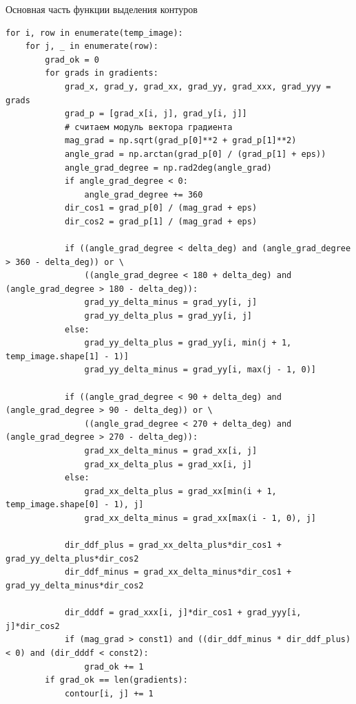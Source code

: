 \documentclass[14pt, russian]{scrartcl}
\begin{document}
\begin{listing}[H]
    \caption{Основная часть функции выделения контуров}
    \label{lst:cont_extr_func}
    \begin{verbatim}
for i, row in enumerate(temp_image):
    for j, _ in enumerate(row):
        grad_ok = 0
        for grads in gradients:
            grad_x, grad_y, grad_xx, grad_yy, grad_xxx, grad_yyy = grads
            grad_p = [grad_x[i, j], grad_y[i, j]]
            # считаем модуль вектора градиента
            mag_grad = np.sqrt(grad_p[0]**2 + grad_p[1]**2)
            angle_grad = np.arctan(grad_p[0] / (grad_p[1] + eps))
            angle_grad_degree = np.rad2deg(angle_grad)
            if angle_grad_degree < 0:  
                angle_grad_degree += 360
            dir_cos1 = grad_p[0] / (mag_grad + eps)
            dir_cos2 = grad_p[1] / (mag_grad + eps)

            if ((angle_grad_degree < delta_deg) and (angle_grad_degree > 360 - delta_deg)) or \
                ((angle_grad_degree < 180 + delta_deg) and (angle_grad_degree > 180 - delta_deg)):     
                grad_yy_delta_minus = grad_yy[i, j]
                grad_yy_delta_plus = grad_yy[i, j]
            else:
                grad_yy_delta_plus = grad_yy[i, min(j + 1, temp_image.shape[1] - 1)]
                grad_yy_delta_minus = grad_yy[i, max(j - 1, 0)]

            if ((angle_grad_degree < 90 + delta_deg) and (angle_grad_degree > 90 - delta_deg)) or \
                ((angle_grad_degree < 270 + delta_deg) and (angle_grad_degree > 270 - delta_deg)):
                grad_xx_delta_minus = grad_xx[i, j]
                grad_xx_delta_plus = grad_xx[i, j]
            else:
                grad_xx_delta_plus = grad_xx[min(i + 1, temp_image.shape[0] - 1), j]
                grad_xx_delta_minus = grad_xx[max(i - 1, 0), j]

            dir_ddf_plus = grad_xx_delta_plus*dir_cos1 + grad_yy_delta_plus*dir_cos2
            dir_ddf_minus = grad_xx_delta_minus*dir_cos1 + grad_yy_delta_minus*dir_cos2

            dir_dddf = grad_xxx[i, j]*dir_cos1 + grad_yyy[i, j]*dir_cos2     
            if (mag_grad > const1) and ((dir_ddf_minus * dir_ddf_plus) < 0) and (dir_dddf < const2):
                grad_ok += 1       
        if grad_ok == len(gradients):
            contour[i, j] += 1
    \end{verbatim}
\end{listing}
\end{document}
